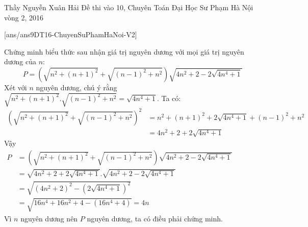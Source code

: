 \begin{name}
{Thầy  Nguyễn Xuân Hải}
{Đề thi vào 10, Chuyên Toán Đại Học Sư Phạm Hà Nội vòng 2, 2016}
\end{name}
\setcounter{ex}{0}
[ans/ans9DT16-ChuyenSuPhamHaNoi-V2]
\begin{ex}%
  Chứng minh biểu thức sau nhận giá trị nguyên dương với mọi giá trị nguyên dương của $n$:
  $$P=\left ( \sqrt{n^2+\left ( n+1 \right )^2}+\sqrt{\left ( n-1 \right )^2+n^2} \right )\sqrt{4n^2+2-2\sqrt{4n^4+1}}$$
\loigiai
    {
    Xét với $n$ nguyên dương, chú ý rằng $\sqrt{n^2+(n+1)^2}.\sqrt{(n-1)^2+n^2}=\sqrt{4n^4+1}$. Ta có:\\
  $ \begin{aligned}
   \left(\sqrt{n^2+(n+1)^2}+\sqrt{(n-1)^2+n^2}\right)^2&=n^2+(n+1)^2+2\sqrt{4n^4+1}+(n-1)^2+n^2\\
   &=4n^2+2+2\sqrt{4n^4+1}
   \end{aligned}$\\
   Vậy \\
  $ \begin{aligned}
   P&=\left ( \sqrt{n^2+\left ( n+1 \right )^2}+\sqrt{\left ( n-1 \right )^2+n^2} \right )\sqrt{4n^2+2-2\sqrt{4n^4+1}}\\
   &=\sqrt{4n^2+2+2\sqrt{4n^4+1}}.\sqrt{4n^2+2-2\sqrt{4n^4+1}}\\
   &=\sqrt{(4n^2+2)^2-(2\sqrt{4n^4+1})^2}\\
   &=\sqrt{16n^4+16n^2+4-(16n^4+4)}=4n
   \end{aligned}$\\
   Vì $n$ nguyên dương nên $P$ nguyên dương, ta có điều phải chứng minh.
    }
\end{ex}

